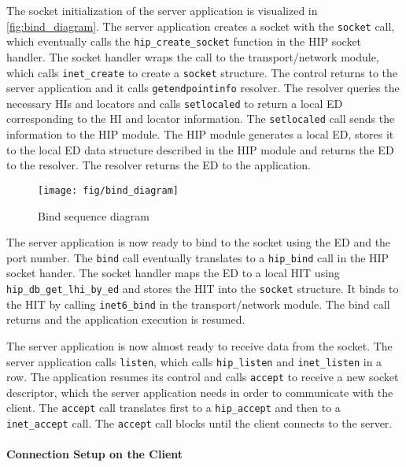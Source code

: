 The socket initialization of the server application is visualized in
\autoref{fig:bind_diagram}. The server application creates a socket
with the \verb|socket| call, which eventually calls the
\verb|hip_create_socket| function in the HIP socket handler. The
socket handler wraps the call to the transport/network module, which
calls \verb|inet_create| to create a \verb|socket| structure. The
control returns to the server application and it calls
\verb|getendpointinfo| resolver. The resolver queries the necessary
HIs and locators and calls \verb|setlocaled| to return a local ED
corresponding to the HI and locator information. The \verb|setlocaled|
call sends the information to the HIP module. The HIP module generates
a local ED, stores it to the local ED data structure described in the
HIP module and returns the ED to the resolver. The resolver returns
the ED to the application.

\begin{figure}[htb]
\begin{center}
\texttt{[image: fig/bind\_diagram]}
\end{center}
\caption{Bind sequence diagram}
\label{fig:bind_diagram}
\end{figure}

The server application is now ready to bind to the socket using the ED
and the port number. The \verb|bind| call eventually translates to a
\verb|hip_bind| call in the HIP socket hander. The socket handler maps
the ED to a local HIT using \verb|hip_db_get_lhi_by_ed| and stores the
HIT into the \verb|socket| structure. It binds to the HIT by calling
\verb|inet6_bind| in the transport/network module. The bind call
returns and the application execution is resumed.

The server application is now almost ready to receive data from the
socket. The server application calls \verb|listen|, which calls
\verb|hip_listen| and \verb|inet_listen| in a row. The application
resumes its control and calls \verb|accept| to receive a new socket
descriptor, which the server application needs in order to communicate
with the client. The \verb|accept| call translates first to a
\verb|hip_accept| and then to a \verb|inet_accept| call. The
\verb|accept| call blocks until the client connects to the server.

\paragraph{Connection Setup on the Client}

